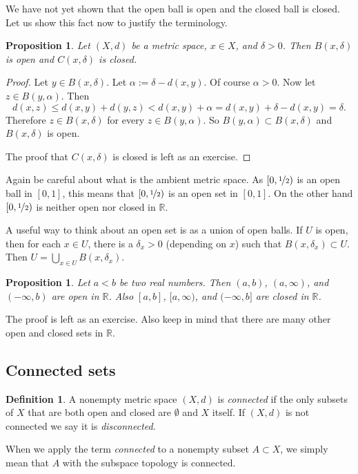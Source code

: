 \documentclass[12pt]{book}
\newcommand{\R}{{\mathbb{R}}}
\newcommand{\myindex}[1]{#1\index{#1}}
\theoremstyle{plain}
\newtheorem{prop}[thm]{Proposition}
\theoremstyle{remark}
\theoremstyle{definition}
\newtheorem{defn}[thm]{Definition}
\theoremstyle{exercise}
\theoremstyle{example}
\begin{document}
We have not yet shown that the open ball is open and the closed ball is
closed.  Let us show this fact now to justify the terminology.

\begin{prop} \label{prop:topology:ballsopenclosed}
Let $(X,d)$ be a metric space, $x \in X$, and $\delta > 0$.  Then
$B(x,\delta)$ is open and 
$C(x,\delta)$ is closed.
\end{prop}

\begin{proof}
Let $y \in B(x,\delta)$.  Let $\alpha := \delta-d(x,y)$.  Of course $\alpha
> 0$.  Now let $z \in B(y,\alpha)$.  Then
\begin{equation*}
d(x,z) \leq d(x,y) + d(y,z) < d(x,y) + \alpha = d(x,y) + \delta-d(x,y) =
\delta .
\end{equation*}
Therefore $z \in B(x,\delta)$ for every $z \in B(y,\alpha)$.  So $B(y,\alpha) \subset B(x,\delta)$ and
$B(x,\delta)$ is open.

The proof that $C(x,\delta)$ is closed is left as an exercise.
\end{proof}

Again be careful about what is the ambient metric space.
As $[0,\nicefrac{1}{2})$ is
an open ball in $[0,1]$, this means that $[0,\nicefrac{1}{2})$ is
an open set in $[0,1]$.  On the other hand $[0,\nicefrac{1}{2})$
is neither open nor closed in $\R$.

A useful way to think about an open set is as a union of open balls.  If $U$ is
open, then for each $x \in U$, there is a $\delta_x > 0$ (depending on $x$) such that
$B(x,\delta_x) \subset U$.  Then $U = \bigcup_{x\in U} B(x,\delta_x)$.

\begin{prop} \label{prop:topology:intervals:openclosed}
Let $a < b$ be two real numbers.  Then $(a,b)$, $(a,\infty)$,
and $(-\infty,b)$ are open in $\R$.
Also $[a,b]$, $[a,\infty)$,
and $(-\infty,b]$ are closed in $\R$.
\end{prop}

The proof is left as an exercise.  Also keep in mind that
there are many other open and
closed sets in $\R$.


\subsection{Connected sets}

\begin{defn}
A nonempty
metric space $(X,d)$ is \emph{\myindex{connected}} if the
only subsets of $X$ that are both open and closed are $\emptyset$ and $X$ itself.
If $(X,d)$ is not connected we say it is
\emph{\myindex{disconnected}}.

When we apply the term \emph{connected} to a nonempty subset $A \subset X$, we simply
mean that $A$ with the subspace topology is connected.
\end{defn}
\end{document}

